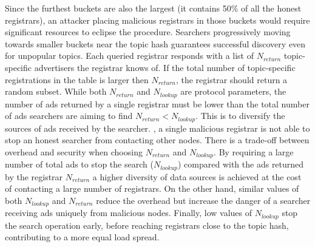 Since the furthest buckets are also the largest (\ie it contains 50\% of all the honest registrars), an attacker placing malicious registrars in those buckets would require significant resources to eclipse the procedure. 
Searchers progressively moving towards smaller buckets near the topic hash guarantees successful discovery even for unpopular topics.
Each queried registrar responds with a list of $N_\textit{return}$ topic-specific advertisers the registrar knows of. 
If the total number of topic-specific registrations in the table is larger then
$N_\textit{return}$, the registrar should return a random subset.
While both $N_\textit{return}$ and $N_\textit{lookup}$ are protocol parameters,
the number of ads returned by a single registrar must be lower than the total
number of ads searchers are aiming to find $N_\textit{return} <
N_\textit{lookup}$. This is to diversify the sources of ads received by the searcher. \Ie, a single malicious registrar is not able to stop an honest searcher from contacting other nodes.
There is a trade-off between overhead and security when choosing $N_\textit{return}$ and $N_\textit{lookup}$. 
By requiring a large number of total ads to stop the search
($N_\textit{lookup}$) compared with the ads returned by the registrar
$N_\textit{return}$ a higher diversity of data sources is achieved at the cost of contacting a large number of registrars. On the other hand, similar values of both $N_\textit{lookup}$ and $N_\textit{return}$ reduce the overhead but increase the danger of a searcher receiving ads uniquely from malicious nodes. Finally, low values of $N_\textit{lookup}$ stop the search operation early, before reaching registrars close to the topic hash, contributing to a more equal load spread.

